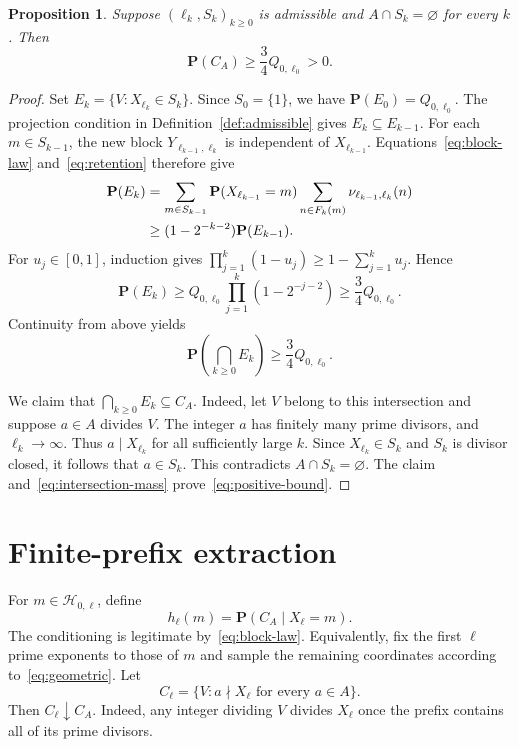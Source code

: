\documentclass[11pt]{amsart}
\newtheorem{proposition}[theorem]{Proposition}
\theoremstyle{definition}
\numberwithin{equation}{section}
\newcommand{\Prob}{\mathbf P}
\newcommand{\Hblock}[2]{\mathcal H_{#1,#2}}
\begin{document}
\begin{proposition}\label{prop:positive-avoidance}
Suppose $(\ell_k,S_k)_{k\geq0}$ is admissible and $A\cap S_k=\varnothing$ for every $k$.
Then
\begin{equation}\label{eq:positive-bound}
  \Prob(C_A)\geq\frac34 Q_{0,\ell_0}>0.
\end{equation}
\end{proposition}

\begin{proof}
Set $E_k=\{V:X_{\ell_k}\in S_k\}$.
Since $S_0=\{1\}$, we have $\Prob(E_0)=Q_{0,\ell_0}$.
The projection condition in Definition~\ref{def:admissible} gives $E_k\subseteq E_{k-1}$.
For each $m\in S_{k-1}$, the new block $Y_{\ell_{k-1},\ell_k}$ is independent of $X_{\ell_{k-1}}$.
Equations~\eqref{eq:block-law} and~\eqref{eq:retention} therefore give
\begin{align}
  \Prob(E_k)
    &=\sum_{m\in S_{k-1}}\Prob(X_{\ell_{k-1}}=m)
       \sum_{n\in F_k(m)}\nu_{\ell_{k-1},\ell_k}(n)\notag\\
    &\geq (1-2^{-k-2})\Prob(E_{k-1}).\label{eq:survival-step}
\end{align}
For $u_j\in[0,1]$, induction gives
$\prod_{j=1}^k(1-u_j)\geq1-\sum_{j=1}^k u_j$.
Hence
\[
  \Prob(E_k)\geq Q_{0,\ell_0}\prod_{j=1}^k(1-2^{-j-2})
       \geq \frac34 Q_{0,\ell_0}.
\]
Continuity from above yields
\begin{equation}\label{eq:intersection-mass}
  \Prob\left(\bigcap_{k\geq0}E_k\right)\geq\frac34 Q_{0,\ell_0}.
\end{equation}

We claim that $\bigcap_{k\geq0}E_k\subseteq C_A$.
Indeed, let $V$ belong to this intersection and suppose $a\in A$ divides $V$.
The integer $a$ has finitely many prime divisors, and $\ell_k\to\infty$.
Thus $a\mid X_{\ell_k}$ for all sufficiently large $k$.
Since $X_{\ell_k}\in S_k$ and $S_k$ is divisor closed, it follows that $a\in S_k$.
This contradicts $A\cap S_k=\varnothing$.
The claim and~\eqref{eq:intersection-mass} prove~\eqref{eq:positive-bound}.
\end{proof}

\section{Finite-prefix extraction}

For $m\in\Hblock{0}{\ell}$, define
\begin{equation}\label{eq:conditional-survival}
  h_\ell(m)=\Prob(C_A\mid X_\ell=m).
\end{equation}
The conditioning is legitimate by~\eqref{eq:block-law}.
Equivalently, fix the first $\ell$ prime exponents to those of $m$ and sample the remaining coordinates according to~\eqref{eq:geometric}.
Let
\begin{equation}\label{eq:prefix-safe}
  C_\ell=\{V: a\nmid X_\ell\text{ for every }a\in A\}.
\end{equation}
Then $C_\ell\downarrow C_A$.
Indeed, any integer dividing $V$ divides $X_\ell$ once the prefix contains all of its prime divisors.
\end{document}
